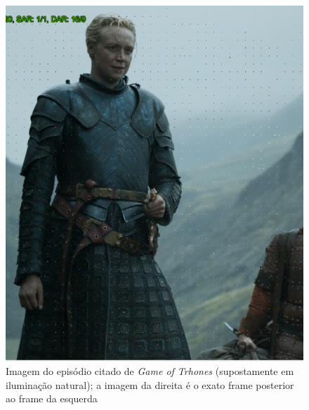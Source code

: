 \begin{figure}[H]
    \centering
    \caption{Imagem do episódio citado de \textit{Game of Trhones} (supostamente em iluminação natural); a imagem da direita é o exato frame posterior ao frame da esquerda}
    \label{fig:imagem22-23}
    
    \includegraphics[scale=0.3]{Documeto/1-ElementosTextuais/images/22.png}

\end{figure}
